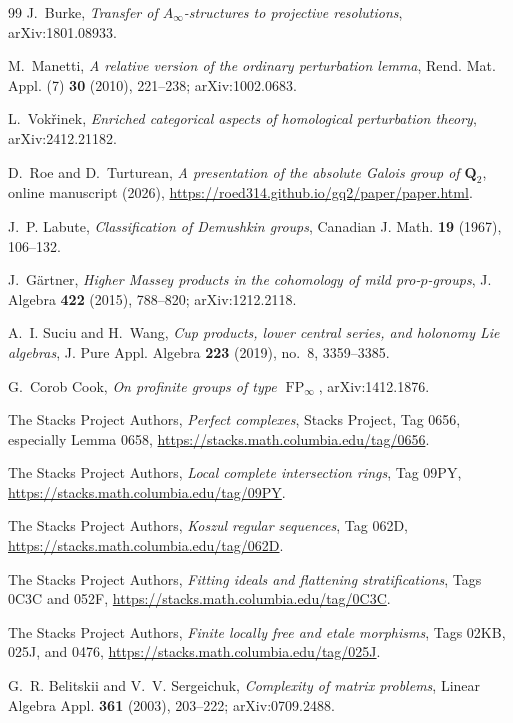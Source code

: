 \documentclass[11pt]{article}
\theoremstyle{definition}
\begin{document}
\begin{thebibliography}{99}
J.~Burke,
\emph{Transfer of $A_\infty$-structures to projective resolutions},
arXiv:1801.08933.

M.~Manetti,
\emph{A relative version of the ordinary perturbation lemma},
Rend. Mat. Appl. (7) \textbf{30} (2010), 221--238; arXiv:1002.0683.

L.~Vok\v{r}inek,
\emph{Enriched categorical aspects of homological perturbation theory},
arXiv:2412.21182.

D.~Roe and D.~Turturean,
\emph{A presentation of the absolute Galois group of $\mathbf Q_2$},
online manuscript (2026),
\url{https://roed314.github.io/gq2/paper/paper.html}.

J.~P. Labute,
\emph{Classification of Demushkin groups},
Canadian J. Math. \textbf{19} (1967), 106--132.

J.~G\"artner,
\emph{Higher Massey products in the cohomology of mild pro-$p$-groups},
J. Algebra \textbf{422} (2015), 788--820; arXiv:1212.2118.

A.~I. Suciu and H.~Wang,
\emph{Cup products, lower central series, and holonomy Lie algebras},
J. Pure Appl. Algebra \textbf{223} (2019), no.~8, 3359--3385.

G.~Corob Cook,
\emph{On profinite groups of type $\operatorname{FP}_\infty$},
arXiv:1412.1876.

The Stacks Project Authors,
\emph{Perfect complexes},
Stacks Project, Tag 0656, especially Lemma 0658,
\url{https://stacks.math.columbia.edu/tag/0656}.

The Stacks Project Authors,
\emph{Local complete intersection rings},
Tag 09PY,
\url{https://stacks.math.columbia.edu/tag/09PY}.

The Stacks Project Authors,
\emph{Koszul regular sequences},
Tag 062D,
\url{https://stacks.math.columbia.edu/tag/062D}.

The Stacks Project Authors,
\emph{Fitting ideals and flattening stratifications},
Tags 0C3C and 052F,
\url{https://stacks.math.columbia.edu/tag/0C3C}.


The Stacks Project Authors,
\emph{Finite locally free and etale morphisms},
Tags 02KB, 025J, and 0476,
\url{https://stacks.math.columbia.edu/tag/025J}.

G.~R. Belitskii and V.~V. Sergeichuk,
\emph{Complexity of matrix problems},
Linear Algebra Appl. \textbf{361} (2003), 203--222; arXiv:0709.2488.


\end{thebibliography}
\end{document}
